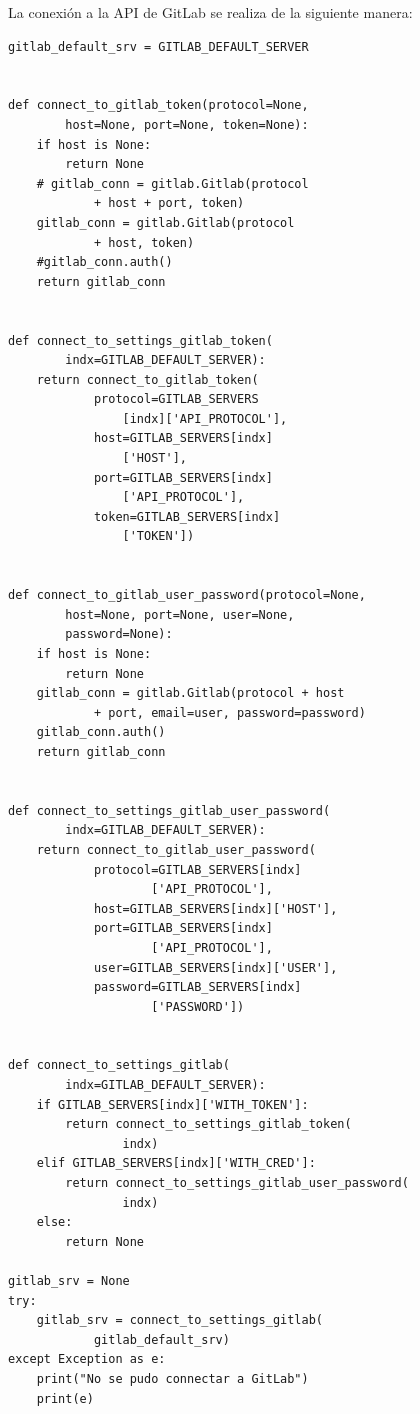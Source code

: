 La conexión a la API de GitLab se realiza de la siguiente manera:
\lstset{language=Python}
\begin{lstlisting}
gitlab_default_srv = GITLAB_DEFAULT_SERVER


def connect_to_gitlab_token(protocol=None,
        host=None, port=None, token=None):
    if host is None:
        return None
    # gitlab_conn = gitlab.Gitlab(protocol
            + host + port, token)
    gitlab_conn = gitlab.Gitlab(protocol
            + host, token)
    #gitlab_conn.auth()
    return gitlab_conn


def connect_to_settings_gitlab_token(
        indx=GITLAB_DEFAULT_SERVER):
    return connect_to_gitlab_token(
            protocol=GITLAB_SERVERS
                [indx]['API_PROTOCOL'],
            host=GITLAB_SERVERS[indx]
                ['HOST'],
            port=GITLAB_SERVERS[indx]
                ['API_PROTOCOL'],
            token=GITLAB_SERVERS[indx]
                ['TOKEN'])


def connect_to_gitlab_user_password(protocol=None,
        host=None, port=None, user=None,
        password=None):
    if host is None:
        return None
    gitlab_conn = gitlab.Gitlab(protocol + host
            + port, email=user, password=password)
    gitlab_conn.auth()
    return gitlab_conn


def connect_to_settings_gitlab_user_password(
        indx=GITLAB_DEFAULT_SERVER):
    return connect_to_gitlab_user_password(
            protocol=GITLAB_SERVERS[indx]
                    ['API_PROTOCOL'],
            host=GITLAB_SERVERS[indx]['HOST'],
            port=GITLAB_SERVERS[indx]
                    ['API_PROTOCOL'],
            user=GITLAB_SERVERS[indx]['USER'],
            password=GITLAB_SERVERS[indx]
                    ['PASSWORD'])


def connect_to_settings_gitlab(
        indx=GITLAB_DEFAULT_SERVER):
    if GITLAB_SERVERS[indx]['WITH_TOKEN']:
        return connect_to_settings_gitlab_token(
                indx)
    elif GITLAB_SERVERS[indx]['WITH_CRED']:
        return connect_to_settings_gitlab_user_password(
                indx)
    else:
        return None

gitlab_srv = None
try:
    gitlab_srv = connect_to_settings_gitlab(
            gitlab_default_srv)
except Exception as e:
    print("No se pudo connectar a GitLab")
    print(e)
\end{lstlisting}
\lstset{language=Bash}

